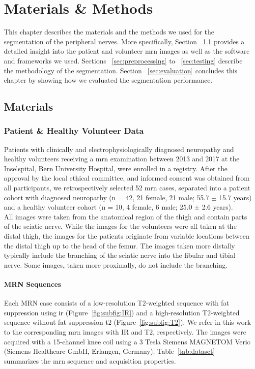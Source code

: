 \chapter{Materials \& Methods} \label{chap:methods}
This chapter describes the materials and the methods we used for the segmentation of the peripheral nerves. More specifically, Section ~\ref{sec:materials} provides a detailed insight into the patient and volunteer \gls{mrn} images as well as the software and frameworks we used. Sections ~\ref{sec:preprocessing} to ~\ref{sec:testing} describe the methodology of the segmentation. Section ~\ref{sec:evaluation} concludes this chapter by showing how we evaluated the segmentation performance.

\section{Materials} \label{sec:materials}

\subsection{Patient \& Healthy Volunteer Data}
Patients with clinically and electrophysiologically diagnosed neuropathy and healthy volunteers receiving a \gls{mrn} examination between 2013 and 2017 at the Inselspital, Bern University Hospital, were enrolled in a registry. After the approval by the local ethical committee, and informed consent was obtained from all participants, we retrospectively selected 52 \gls{mrn} cases, separated into a patient cohort with diagnosed neuropathy (n = 42, 21 female, 21 male; 55.7 $\pm$ 15.7 years) and a healthy volunteer cohort (n = 10, 4 female, 6 male; 25.0 $\pm$ 2.6 years).\\
All images were taken from the anatomical region of the thigh and contain parts of the sciatic nerve. While the images for the volunteers were all taken at the distal thigh, the images for the patients originate from variable locations between the distal thigh up to the head of the femur. The images taken more distally typically include the branching of the sciatic nerve into the fibular and tibial nerve. Some images, taken more proximally, do not include the branching.\\

\subsubsection{MRN Sequences} \label{dataset_mrn}
Each MRN case consists of a low-resolution T2-weighted sequence with fat suppression using \gls{ir} (Figure~\ref{fig:subfig:IR}) and a high-resolution T2-weighted sequence without fat suppression \gls{t2} (Figure~\ref{fig:subfig:T2}). We refer in this work to the corresponding \gls{mrn} images with IR and T2, respectively. The images were acquired with a 15-channel knee coil using a 3 Tesla Siemens MAGNETOM Verio (Siemens Healthcare GmbH, Erlangen, Germany). Table~\ref{tab:dataset} summarizes the \gls{mrn} sequence and acquisition properties.

